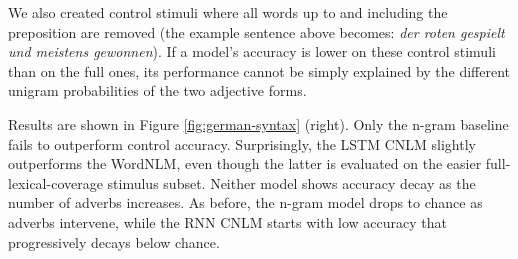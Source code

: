 We also created control stimuli where all words up to and including
the preposition are removed (the example sentence above becomes:
\textit{der roten gespielt und meistens gewonnen}). If a model's
accuracy is lower on these control stimuli than on the full ones, its
performance cannot be simply explained by the different unigram
probabilities of the two adjective forms.
%
%

Results are shown in Figure \ref{fig:german-syntax} (right). Only the
n-gram baseline fails to outperform control accuracy. Surprisingly,
the LSTM CNLM slightly outperforms the WordNLM, even though the latter
is evaluated on the easier full-lexical-coverage stimulus subset.
Neither model shows accuracy decay as the number of adverbs increases.
As before, the n-gram model drops to chance as adverbs intervene,
while the RNN CNLM starts with low accuracy that progressively decays
below chance.


